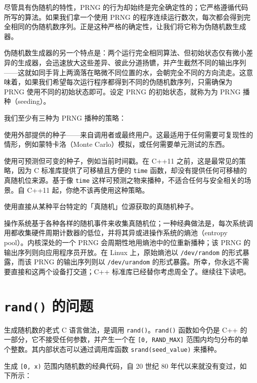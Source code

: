 尽管具有伪随机的特性，PRNG 的行为却始终是完全确定性的；它严格遵循代码所写的算法。如果我们拿一个使用 PRNG 的程序连续运行数次，每次都会得到完全相同的伪随机数序列。正是这种严格的确定性，让我们将它称为伪随机数生成器。

伪随机数生成器的另一个特点是：两个运行完全相同算法、但初始状态仅有微小差异的生成器，会迅速放大这些差异、彼此分道扬镳，并产生截然不同的输出序列——这就如同手背上两滴落在略微不同位置的水，会朝完全不同的方向流走。这意味着，如果我们希望每次运行程序都得到不同的伪随机数序列，只需确保为 PRNG 使用不同的初始状态即可。设定 PRNG 的初始状态，就称为为 PRNG 播种（seeding）。

我们至少有三种为 PRNG 播种的策略：

使用外部提供的种子——来自调用者或最终用户。这最适用于任何需要可复现性的情形，例如蒙特卡洛（Monte Carlo）模拟，或任何需要单元测试的东西。

使用可预测但可变的种子，例如当前时间戳。在 C++11 之前，这是最常见的策略，因为 C 标准库提供了可移植且方便的 \texttt{time} 函数，却没有提供任何可移植的真随机位来源。基于像 \texttt{time} 这样可预测之物来播种，不适合任何与安全相关的场景。自 C++11 起，你绝不该再使用这种策略。

使用直接从某种平台特定的「真随机」位源获取的真随机种子。

操作系统基于各种各样的随机事件来收集真随机位；一种经典做法是，每次系统调用都收集硬件周期计数器的低位，并将其异或进操作系统的熵池（entropy pool）。内核深处的一个 PRNG 会周期性地用熵池中的位重新播种；该 PRNG 的输出序列则向应用程序员开放。在 Linux 上，原始熵池以 \texttt{/\allowbreak{}dev/\allowbreak{}random} 的形式暴露，而该 PRNG 的输出序列则以 \texttt{/\allowbreak{}dev/\allowbreak{}urandom} 的形式暴露。所幸，你永远不需要直接和这两个设备打交道；C++ 标准库已经替你考虑周全了。继续往下读吧。

\section{\texttt{rand(\allowbreak{})\allowbreak{}} 的问题}

生成随机数的老式 C 语言做法，是调用 \texttt{rand(\allowbreak{})\allowbreak{}}。\texttt{rand(\allowbreak{})\allowbreak{}} 函数如今仍是 C++ 的一部分，它不接受任何参数，并产生一个在 \texttt{[0,\allowbreak{} RAND\_\allowbreak{}MAX]} 范围内均匀分布的单个整数。其内部状态可以通过调用库函数 \texttt{srand(\allowbreak{}seed\_\allowbreak{}value)\allowbreak{}} 来播种。

生成 \texttt{[0,\allowbreak{} x)\allowbreak{}} 范围内随机数的经典代码，自 20 世纪 80 年代以来就没有变过，如下所示：

